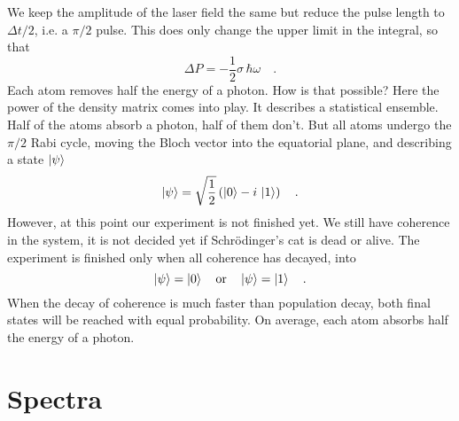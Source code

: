 We keep the amplitude of the laser field the same but reduce the pulse length to $\Delta t / 2$, i.e. a $\pi/2$ pulse. This does only change the upper limit in the integral, so that 
\begin{equation}
 \Delta P 
= -  \frac{1}{2} \sigma \,  \hbar \omega   \quad .
\end{equation}
Each atom removes half the energy  of a photon. How is that possible?  Here the power of the density matrix comes into play. It describes a statistical ensemble. Half of the atoms absorb a photon, half of them don't. But all atoms undergo the $\pi/2$ Rabi cycle, moving the Bloch vector into the equatorial plane, and describing a state $\ket{\psi}$
\begin{equation}
 \ket{\psi} = \sqrt{\frac{1}{2}} \left( \ket{0} - i \, \ket{1} \right) \quad .
\end{equation}
However, at this point our experiment is not finished yet. We still have coherence in the system, it is not decided yet if  Schrödinger's cat is dead or alive. The experiment is finished only when all coherence has decayed, into
\begin{equation}
 \ket{\psi} = \ket{0}  \quad \text{or} \quad \ket{\psi} = \ket{1}  \quad .
\end{equation}
When the decay of  coherence is much faster than population decay,  both final states will be reached with equal probability. On average, each atom absorbs half the energy of a photon.


\section{Spectra}

